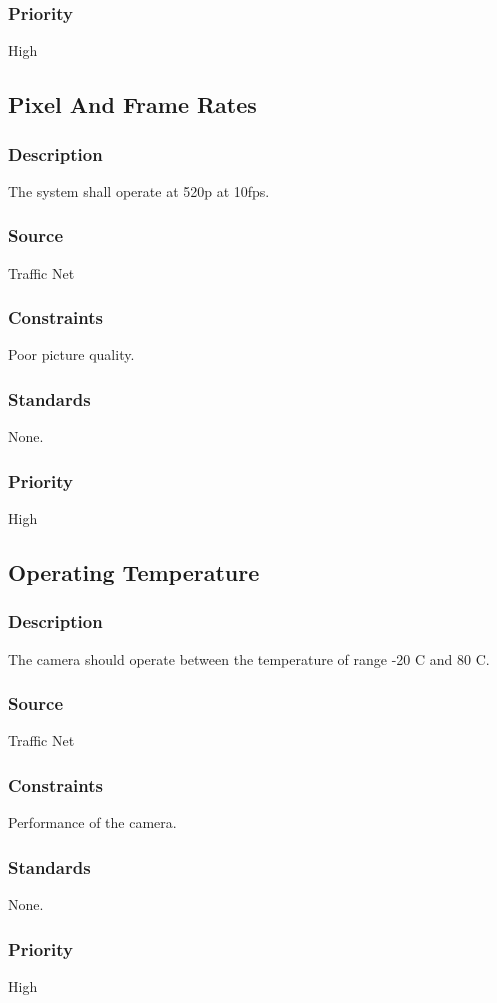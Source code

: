 \subsubsection{Priority}
High

\subsection{Pixel And Frame Rates}
\subsubsection{Description}
The system shall operate at 520p at 10fps.
\subsubsection{Source}
Traffic Net
\subsubsection{Constraints}
Poor picture quality.
\subsubsection{Standards}
None.
\subsubsection{Priority}
High

\subsection{Operating Temperature}
\subsubsection{Description}
The camera should operate between the temperature of range -20 C and 80 C.
\subsubsection{Source}
Traffic Net
\subsubsection{Constraints}
Performance of the camera.
\subsubsection{Standards}
None.
\subsubsection{Priority}
High


